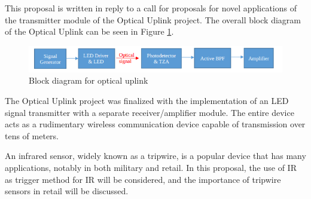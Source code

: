 




\noindent This proposal is written in reply to a call for proposals for novel applications of the transmitter module of the Optical Uplink project. The overall block diagram of the Optical Uplink can be seen in Figure \ref{fig:blockdiagram2}.


\begin{figure}[H]
    \centering
    \includegraphics[width=.9\textwidth ]{Introduction/blockdiagram}
    \caption{Block diagram for optical uplink}
    \label{fig:blockdiagram2}
\end{figure}

The Optical Uplink project was finalized with the implementation of an LED signal transmitter with a separate receiver/amplifier module. The entire device acts as a rudimentary wireless communication device capable of transmission over tens of meters.

An infrared sensor, widely known as a tripwire, is a popular device that has many applications, notably in both military and retail. In this proposal, the use of IR as trigger method for IR will be considered, and the importance of tripwire sensors in retail will be discussed.





